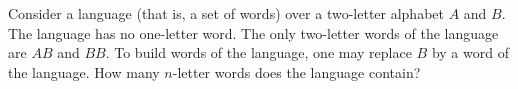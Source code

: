 Consider a language (that is, a set of words) over a two-letter alphabet $A$ and $B$. The language has no one-letter word. The only two-letter words of the language are $AB$ and $BB$. To build words of the language, one may replace $B$ by a word of the language. How many $n$-letter words does the language contain?
